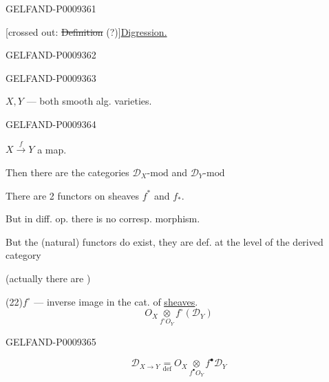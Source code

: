 \begin{GelfandAdjacentEvidence}{GELFAND-P000936}{1}

[crossed out: \sout{Definition} (?)]\qquad\underline{Digression.}
\end{GelfandAdjacentEvidence}
\begin{GelfandAdjacentEvidence}{GELFAND-P000936}{2}

\end{GelfandAdjacentEvidence}
\begin{GelfandAdjacentEvidence}{GELFAND-P000936}{3}


$X,Y$ --- both smooth alg. varieties.
\end{GelfandAdjacentEvidence}
\begin{GelfandAdjacentEvidence}{GELFAND-P000936}{4}


$X\overset f\longrightarrow Y$ a map.

Then there are the categories $\mathcal D_X\text{-mod}$ and $\mathcal D_Y\text{-mod}$

There are 2 functors on sheaves $f^*$ and $f_*$.

But in diff. op. there is no corresp. morphism.

But the (natural) functors do exist, they are def. at the level of the derived category

(actually there are )

(22)\quad $f^\circ$ --- inverse image in the cat. of \underline{\underline{sheaves}}.
\begin{equation*}
 O_X\mathbin{\underset{f^\circ O_Y}{\otimes}} f^\circ(\mathcal D_Y)
 \tag{23}
\end{equation*}
\end{GelfandAdjacentEvidence}
\begin{GelfandAdjacentEvidence}{GELFAND-P000936}{5}


\begin{equation*}
 \mathcal D_{X\to Y}\underset{\mathrm{def}}{=}
 O_X\mathbin{\underset{f^\bullet O_Y}{\otimes}} f^\bullet\mathcal D_Y
 \tag{24}
\end{equation*}
\end{GelfandAdjacentEvidence}
